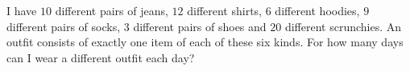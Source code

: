 I have $10$ different pairs of jeans, $12$ different shirts, $6$ different hoodies, $9$ different pairs of socks, $3$ different pairs of shoes and $20$ different scrunchies. An outfit consists of exactly one item of each of these six kinds. For how many days can I wear a different outfit each day?
